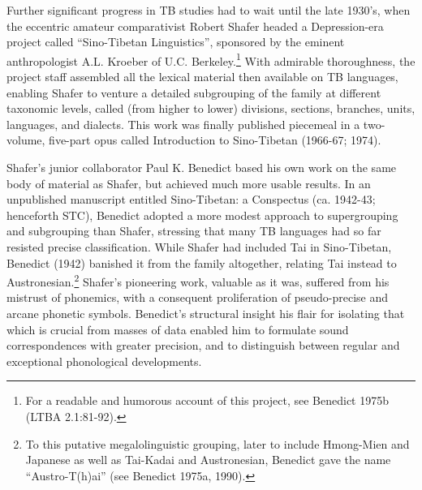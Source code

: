 Further significant progress in TB studies had to wait until the late 1930's, when the eccentric amateur comparativist Robert Shafer headed a Depression-era project called ``Sino-Tibetan Linguistics'', sponsored by the eminent anthropologist A.L. Kroeber of U.C. Berkeley.\footnote{For a readable and humorous account of this project, see Benedict 1975b (LTBA 2.1:81-92).} With admirable thoroughness, the project staff assembled all the lexical material then available on TB languages, enabling Shafer to venture a detailed subgrouping of the family at different taxonomic levels, called (from higher to lower) divisions, sections, branches, units, languages, and dialects. This work was finally published piecemeal in a two-volume, five-part opus called Introduction to Sino-Tibetan (1966-67; 1974).

Shafer's junior collaborator Paul K. Benedict based his own work on the same body of material as Shafer, but achieved much more usable results. In an unpublished manuscript entitled Sino-Tibetan: a Conspectus (ca. 1942-43; henceforth STC), Benedict adopted a more modest approach to supergrouping and subgrouping than Shafer, stressing that many TB languages had so far resisted precise classification. While Shafer had included Tai in Sino-Tibetan, Benedict (1942) banished it from the family altogether, relating Tai instead to Austronesian.\footnote{To this putative megalolinguistic grouping, later to include Hmong-Mien and Japanese as well as Tai-Kadai and Austronesian, Benedict gave the name ``Austro-T(h)ai'' (see Benedict 1975a, 1990).} Shafer's pioneering work, valuable as it was, suffered from his mistrust of phonemics, with a consequent proliferation of pseudo-precise and arcane phonetic symbols. Benedict's structural insight  his flair for isolating that which is crucial from masses of data  enabled him to formulate sound correspondences with greater precision, and to distinguish between regular and exceptional phonological developments.


